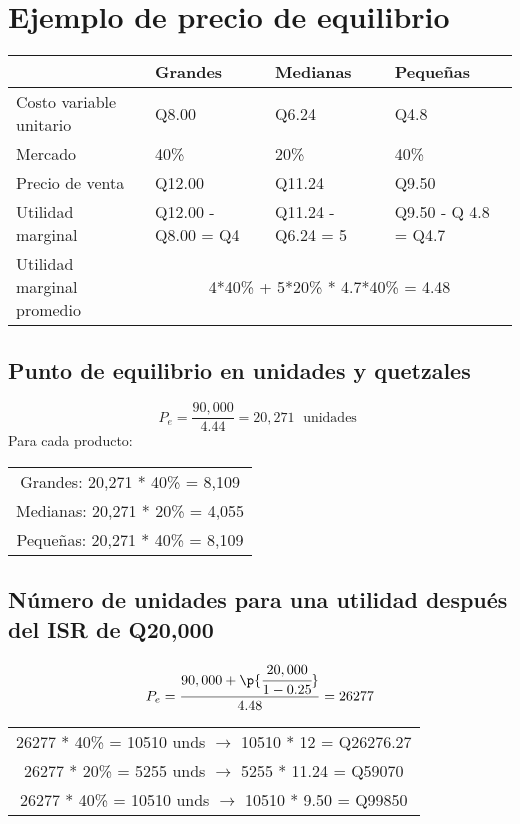 \documentclass{article}
\begin{document}
\section{Ejemplo de precio de equilibrio }
\begin{center}
    \begin{tabular}{ |p{3cm}|p{3cm}|p{3cm}|p{3cm}| }
        \hline
            &  Grandes & Medianas & Pequeñas \\
        \hline
            Costo variable unitario & Q8.00 & Q6.24 & Q4.8 \\ 
            \hline
            Mercado & 40\% & 20\% & 40\% \\ 
            \hline
            Precio de venta & Q12.00 & Q11.24 & Q9.50 \\ 
            Utilidad marginal & 
            Q12.00 - Q8.00 = Q4 & Q11.24 - Q6.24 = 5 & Q9.50 - Q 4.8 = Q4.7 \\ 
            \hline
            Utilidad marginal promedio & \multicolumn{3}{|c|}{4*40\% + 5*20\% * 4.7*40\% = 4.48} \\ 
        \hline
    \end{tabular}
\end{center}

\subsection{Punto de equilibrio en unidades y quetzales}
\[
  P_e = \frac{90,000}{4.44} = 20,271 \;\text{ unidades }
\]
Para cada producto: 
\begin{center}
    \begin{tabular}{ c }
        \hline
            Grandes: 20,271 * 40\% = 8,109 \\
            Medianas: 20,271 * 20\% = 4,055 \\
            Pequeñas: 20,271 * 40\% = 8,109 \\
        \hline
    \end{tabular}
\end{center}

\subsection{Número de unidades para una utilidad después del ISR de Q20,000}
\[
  P_e = \frac{90,000 + \p{\cfrac[]{20,000}{1-0.25}} }{4.48} = 26277
\]
\begin{center}
    \begin{tabular}{ c }
        \hline
            26277 * 40\% = 10510 unds $\rightarrow$ 10510 * 12 = Q26276.27 \\
            26277 * 20\% = 5255 unds $\rightarrow$ 5255 * 11.24 = Q59070 \\
            26277 * 40\% = 10510 unds $\rightarrow$ 10510 * 9.50 = Q99850 \\
        \hline
    \end{tabular}
\end{center}
\end{document}
